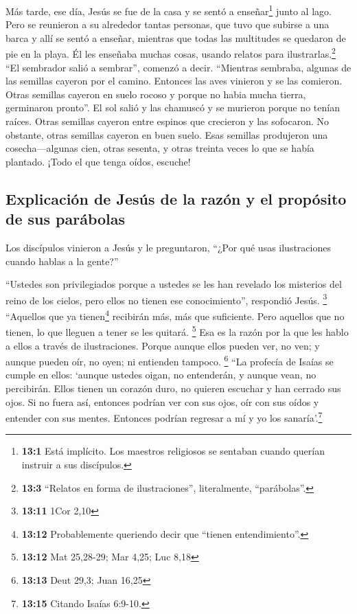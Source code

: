  Más tarde, ese día, Jesús se fue de la casa y se sentó a
enseñar\footnote{\textbf{13:1} Está implícito. Los maestros religiosos
  se sentaban cuando querían instruir a sus discípulos.} junto al lago.
 Pero se reunieron a su alrededor tantas personas, que
tuvo que subirse a una barca y allí se sentó a enseñar, mientras que
todas las multitudes se quedaron de pie en la playa.  Él
les enseñaba muchas cosas, usando relatos para ilustrarlas.\footnote{\textbf{13:3}
  ``Relatos en forma de ilustraciones'', literalmente, ``parábolas''.}
``El sembrador salió a sembrar'', comenzó a decir. 
``Mientras sembraba, algunas de las semillas cayeron por el camino.
Entonces las aves vinieron y se las comieron.  Otras
semillas cayeron en suelo rocoso y porque no habia mucha tierra,
germinaron pronto''.  El sol salió y las chamuscó y se
murieron porque no tenían raíces.  Otras semillas cayeron
entre espinos que crecieron y las sofocaron.  No obstante,
otras semillas cayeron en buen suelo. Esas semillas produjeron una
cosecha---algunas cien, otras sesenta, y otras treinta veces lo que se
había plantado.  ¡Todo el que tenga oídos, escuche!

\hypertarget{explicaciuxf3n-de-jesuxfas-de-la-razuxf3n-y-el-propuxf3sito-de-sus-paruxe1bolas}{%
\subsection{Explicación de Jesús de la razón y el propósito de sus
parábolas}\label{explicaciuxf3n-de-jesuxfas-de-la-razuxf3n-y-el-propuxf3sito-de-sus-paruxe1bolas}}

 Los discípulos vinieron a Jesús y le preguntaron, ``¿Por
qué usas ilustraciones cuando hablas a la gente?''

 ``Ustedes son privilegiados porque a ustedes se les han
revelado los misterios del reino de los cielos, pero ellos no tienen ese
conocimiento'', respondió Jesús. \footnote{\textbf{13:11} 1Cor 2,10}
 ``Aquellos que ya tienen\footnote{\textbf{13:12}
  Probablemente queriendo decir que ``tienen entendimiento''.} recibirán
más, más que suficiente. Pero aquellos que no tienen, lo que lleguen a
tener se les quitará. \footnote{\textbf{13:12} Mat 25,28-29; Mar 4,25;
  Luc 8,18}  Esa es la razón por la que les hablo a ellos
a través de ilustraciones. Porque aunque ellos pueden ver, no ven; y
aunque pueden oír, no oyen; ni entienden tampoco. \footnote{\textbf{13:13}
  Deut 29,3; Juan 16,25}  ``La profecía de Isaías se
cumple en ellos: `aunque ustedes oigan, no entenderán, y aunque vean, no
percibirán.  Ellos tienen un corazón duro, no quieren
escuchar y han cerrado sus ojos. Si no fuera así, entonces podrían ver
con sus ojos, oír con sus oídos y entender con sus mentes. Entonces
podrían regresar a mí y yo los sanaría'.\footnote{\textbf{13:15} Citando
  Isaías 6:9-10.}

